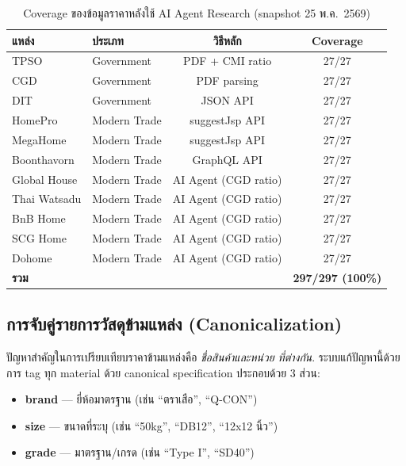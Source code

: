 \begin{table}[H]
  \centering
  \footnotesize
  \caption{Coverage ของข้อมูลราคาหลังใช้ AI Agent Research (snapshot 25 พ.ค.\ 2569)}
  \label{tab:coverage-final}
  \begin{tabular}{llcc}
    \toprule
    แหล่ง & ประเภท & วิธีหลัก & Coverage \\
    \midrule
    TPSO        & Government   & PDF + CMI ratio & 27/27 \\
    CGD         & Government   & PDF parsing     & 27/27 \\
    DIT         & Government   & JSON API        & 27/27 \\
    HomePro     & Modern Trade & suggestJsp API  & 27/27 \\
    MegaHome    & Modern Trade & suggestJsp API  & 27/27 \\
    Boonthavorn & Modern Trade & GraphQL API     & 27/27 \\
    Global House & Modern Trade & AI Agent (CGD ratio) & 27/27 \\
    Thai Watsadu & Modern Trade & AI Agent (CGD ratio) & 27/27 \\
    BnB Home    & Modern Trade & AI Agent (CGD ratio) & 27/27 \\
    SCG Home    & Modern Trade & AI Agent (CGD ratio) & 27/27 \\
    Dohome      & Modern Trade & AI Agent (CGD ratio) & 27/27 \\
    \midrule
    \textbf{รวม} & & & \textbf{297/297 (100\%)} \\
    \bottomrule
  \end{tabular}
\end{table}

\subsection{การจับคู่รายการวัสดุข้ามแหล่ง (Canonicalization)}



ปัญหาสำคัญในการเปรียบเทียบราคาข้ามแหล่งคือ \emph{ชื่อสินค้าและหน่วย
ที่ต่างกัน}. ระบบแก้ปัญหานี้ด้วยการ tag ทุก material ด้วย canonical
specification ประกอบด้วย 3 ส่วน:

\begin{itemize}[leftmargin=2em,itemsep=0.2em]
  \item \textbf{brand} — ยี่ห้อมาตรฐาน (เช่น ``ตราเสือ'', ``Q-CON'')
  \item \textbf{size} — ขนาดที่ระบุ (เช่น ``50kg'', ``DB12'',
        ``12x12 นิ้ว'')
  \item \textbf{grade} — มาตรฐาน/เกรด (เช่น ``Type I'', ``SD40'')
\end{itemize}

